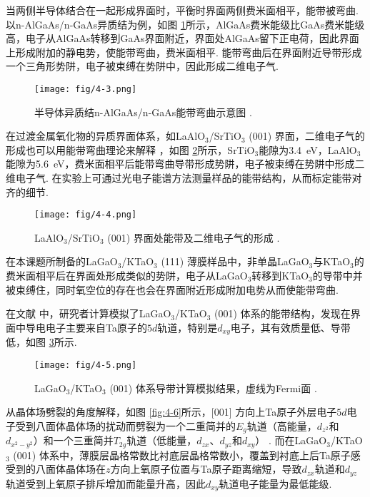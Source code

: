 \documentclass[12pt,a4paper,openany,twoside,UTF-8]{book}
\begin{document}
当两侧半导体结合在一起形成界面时，平衡时界面两侧费米面相平，能带被弯曲. 以n-AlGaAs/n-GaAs异质结为例，如图 \ref{fig:4-3}所示，AlGaAs费米能级比GaAs费米能级高，电子从AlGaAs转移到GaAs界面附近，界面处AlGaAs留下正电荷，因此界面上形成附加的静电势，使能带弯曲，费米面相平. 能带弯曲后在界面附近导带形成一个三角形势阱，电子被束缚在势阱中，因此形成二维电子气. 

\begin{figure}[htbp]
\centering
\texttt{[image: fig/4-3.png]}
\caption{半导体异质结n-AlGaAs/n-GaAs能带弯曲示意图 \cite{ref42}.}
\label{fig:4-3} 
\end{figure}

在过渡金属氧化物的异质界面体系，如LaAlO$_3$/SrTiO$_3$ (001) 界面，二维电子气的形成也可以用能带弯曲理论来解释 \cite{ref43}，如图 \ref{fig:4-4}所示，SrTiO$_3$能隙为\SI{3.4}{eV}，LaAlO$_3$能隙为\SI{5.6}{eV}，费米面相平后能带弯曲导带形成势阱，电子被束缚在势阱中形成二维电子气. 在实验上可通过光电子能谱方法测量样品的能带结构，从而标定能带对齐的细节.
\begin{figure}[htbp]
\centering
\texttt{[image: fig/4-4.png]}
\caption{LaAlO$_3$/SrTiO$_3$ (001) 界面处能带及二维电子气的形成 \cite{ref43}.}
\label{fig:4-4} 
\end{figure}

在本课题所制备的LaGaO$_3$/KTaO$_3$ (111) 薄膜样品中，非单晶LaGaO$_3$与KTaO$_3$的费米面相平后在界面处形成类似的势阱，电子从LaGaO$_3$转移到KTaO$_3$的导带中并被束缚住，同时氧空位的存在也会在界面附近形成附加电势从而使能带弯曲.

在文献 \cite{ref44}中，研究者计算模拟了LaGaO$_3$/KTaO$_3$ (001) 体系的能带结构，发现在界面中导电电子主要来自Ta原子的$5d$轨道，特别是$d_{xy}$电子，其有效质量低、导带低，如图 \ref{fig:4-5}所示.

\begin{figure}[htbp]
\centering
\texttt{[image: fig/4-5.png]}
\caption{LaGaO$_3$/KTaO$_3$ (001) 体系导带计算模拟结果，虚线为Fermi面 \cite{ref44}.}
\label{fig:4-5} 
\end{figure}

从晶体场劈裂的角度解释，如图 \ref{fig:4-6}所示，[001] 方向上Ta原子外层电子$5d$电子受到八面体晶体场的扰动而劈裂为一个二重简并的$E_g$轨道（高能量，$d_{z^2}$和$d_{x^2-y^2}$）和一个三重简并$T_{2g}$轨道（低能量，$d_{zx}$、$d_{yz}$和$d_{xy}$） \cite{ref5}. 而在LaGaO$_3$/KTaO$_3$ (001) 体系中，薄膜层晶格常数比衬底层晶格常数小，覆盖到衬底上后Ta原子感受到的八面体晶体场在$z$方向上氧原子位置与Ta原子距离缩短，导致$d_{zx}$轨道和$d_{yz}$轨道受到上氧原子排斥增加而能量升高，因此$d_{xy}$轨道电子能量为最低能级.
\end{document}
